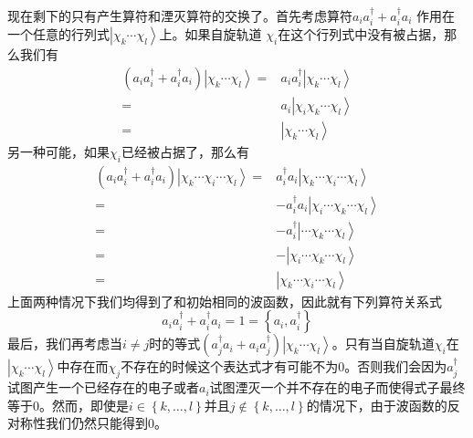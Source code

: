 \documentclass[12pt,a4paper,openany,twoside]{book}
\numberwithin{equation}{section}
\begin{document}
      现在剩下的只有产生算符和湮灭算符的交换了。首先考虑算符$a_i a_i^\dagger+a_i^\dagger a_i$
      作用在一个任意的行列式$\left|\chi_k\cdots\chi_l\right\rangle$上。如果自旋轨道
      $\chi_i$在这个行列式中没有被占据，那么我们有
      \begin{equation}
          \begin{aligned}
              \left(a_i a_i^\dagger+a_i^\dagger a_i\right)\left|\chi_k\cdots\chi_l\right\rangle
              =&a_i a_i^\dagger\left|\chi_k\cdots\chi_l\right\rangle\\
              =&a_i\left|\chi_i\chi_k\cdots\chi_l\right\rangle\\
              =&\left|\chi_k\cdots\chi_l\right\rangle
          \end{aligned}
      \end{equation}
      另一种可能，如果$\chi_i$已经被占据了，那么有
      \begin{equation}
          \begin{aligned}
              \left(a_i a_i^\dagger+a_i^\dagger a_i\right)\left|\chi_k\cdots\chi_i\cdots\chi_l\right\rangle
              =&a_i^\dagger a_i\left|\chi_k\cdots\chi_i\cdots\chi_l\right\rangle\\
              =&-a_i^\dagger a_i\left|\chi_i\cdots\chi_k\cdots\chi_l\right\rangle\\
              =&-a_i^\dagger\left|\cdots\chi_k\cdots\chi_l\right\rangle\\
              =&-\left|\chi_i\cdots\chi_k\cdots\chi_l\right\rangle\\
              =&\left|\chi_k\cdots\chi_i\cdots\chi_l\right\rangle
          \end{aligned}
      \end{equation}
      上面两种情况下我们均得到了和初始相同的波函数，因此就有下列算符关系式
      \begin{equation}
          a_i a_i^\dagger+a_i^\dagger a_i=1=\left\{a_i,a_i^\dagger\right\}
          \label{anti commutator ai ai^dagger}
      \end{equation}
      最后，我们再考虑当$i\neq j$时的等式$\left(a_j^\dagger a_i+a_i a_j^\dagger\right)\left|\chi_k\cdots \chi_l\right\rangle$。只有当自旋轨道$\chi_i$在$\left|\chi_k\cdots\chi_l\right\rangle$中存在而$\chi_j$不存在的时候这个表达式才有可能不为0。否则我们会因为$a_j^\dagger$试图产生一个已经存在的电子或者$a_i$试图湮灭一个并不存在的电子而使得式子最终等于0。然而，即使是$i\in\left\{k,\ldots,l\right\}$并且$j\notin\left\{k,\ldots,l\right\}$的情况下，由于波函数的反对称性我们仍然只能得到0。
\end{document}
